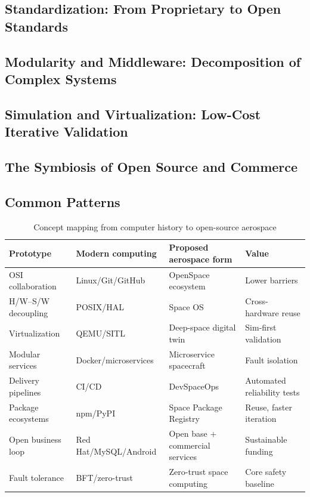 \documentclass[11pt]{article}
\begin{document}
\subsection{Standardization: From Proprietary to Open Standards}
\subsection{Modularity and Middleware: Decomposition of Complex Systems}
\subsection{Simulation and Virtualization: Low-Cost Iterative Validation}
\subsection{The Symbiosis of Open Source and Commerce}
\subsection{Common Patterns}
\begin{table}[htbp]
\centering
\caption{Concept mapping from computer history to open-source aerospace}
\begin{tabular}{@{}llll@{}}
\toprule
Prototype & Modern computing & Proposed aerospace form & Value \\
\midrule
OSI collaboration & Linux/Git/GitHub & OpenSpace ecosystem & Lower barriers \\
H/W--S/W decoupling & POSIX/HAL & Space OS & Cross-hardware reuse \\
Virtualization & QEMU/SITL & Deep-space digital twin & Sim-first validation \\
Modular services & Docker/microservices & Microservice spacecraft & Fault isolation \\
Delivery pipelines & CI/CD & DevSpaceOps & Automated reliability tests \\
Package ecosystems & npm/PyPI & Space Package Registry & Reuse, faster iteration \\
Open business loop & Red Hat/MySQL/Android & Open base + commercial services & Sustainable funding \\
Fault tolerance & BFT/zero-trust & Zero-trust space computing & Core safety baseline \\
\bottomrule
\end{tabular}
\end{table}

\end{document}
